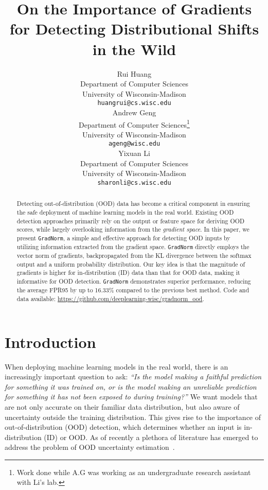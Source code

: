 \documentclass{article}
\title{On the Importance of Gradients for Detecting Distributional Shifts in the Wild}
\author{Rui Huang \\
  Department of Computer Sciences\\
  University of Wisconsin-Madison\\
  \texttt{huangrui@cs.wisc.edu} \\
  \And 
  Andrew Geng \\
  Department of Computer Sciences\thanks{Work done while A.G was working as an undergraduate research assistant with Li's lab.}\\
  University of Wisconsin-Madison\\
  \texttt{ageng@wisc.edu} \\
  \And
  Yixuan Li \\
  Department of Computer Sciences\\
  University of Wisconsin-Madison\\
  \texttt{sharonli@cs.wisc.edu} \\
}
\begin{document}
\maketitle


\begin{abstract}
Detecting out-of-distribution (OOD) data has become a critical component in ensuring the safe deployment of machine learning models in the real world. 
Existing OOD detection approaches primarily rely on the output or feature space for deriving OOD scores, while largely overlooking information from the \emph{gradient space}.
In this paper, we present \texttt{GradNorm}, a simple and effective approach for detecting OOD inputs by utilizing information extracted from the gradient space. \texttt{GradNorm} directly employs the vector norm of gradients, backpropagated from the KL divergence between the softmax output and a uniform probability distribution. Our key idea is that the magnitude of gradients is higher for in-distribution (ID) data than that for OOD data, making it informative for OOD detection. \texttt{GradNorm} demonstrates superior performance, reducing the average FPR95 by up to {16.33\%} compared to the previous best method. Code and data available: \url{https://github.com/deeplearning-wisc/gradnorm\_ood}.
\end{abstract}

\vspace{-\baselineskip}
\section{Introduction}


When deploying machine learning models in the real world, there is an increasingly important question to ask: \emph{``Is the model making a faithful prediction for something it was trained on, or is the model making an unreliable prediction for something it has not been exposed to during training?''} We want models that are not only accurate on their familiar data distribution, but also aware of uncertainty outside the training distribution. 
This gives rise to the importance of out-of-distribution (OOD) detection, which determines whether an input is in-distribution (ID) or OOD. As of recently a plethora of literature has emerged to address the problem of OOD uncertainty estimation~\cite{chen2021robustifying, hendrycks2016baseline, hsu2020generalized, huang2021mos, lakshminarayanan2017simple, lee2018simple, liang2018enhancing, lin2021mood, liu2020energy,  mohseni2020self, nalisnick2018deep}.
\end{document}

